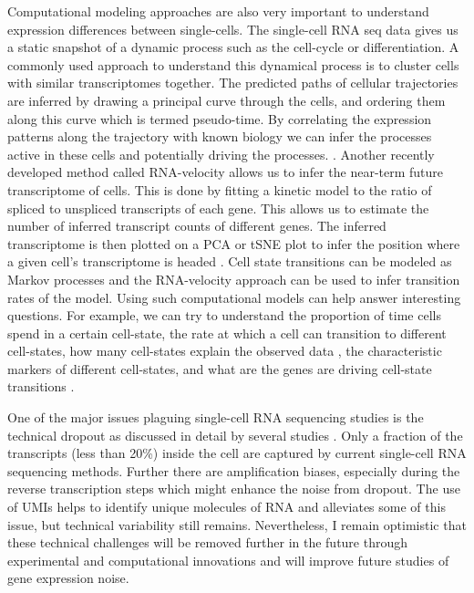 Computational modeling approaches are also very important to understand expression differences between single-cells. The single-cell RNA seq data gives us a static snapshot of a dynamic process such as the cell-cycle or differentiation. A commonly used approach to understand this dynamical process is to cluster cells with similar transcriptomes together. The predicted paths of cellular trajectories are inferred by drawing a principal curve through the cells, and ordering them along this curve which is termed pseudo-time. By correlating the expression patterns along the trajectory with known biology we can infer the processes active in these cells and potentially driving the processes. \cite{trapnell_dynamics_2014}. Another recently developed method called RNA-velocity allows us to infer the near-term future transcriptome of cells. This is done by fitting a kinetic model to the ratio of spliced to unspliced transcripts of each gene. This allows us to estimate the number of inferred transcript counts of different genes. The inferred transcriptome is then plotted on a PCA or tSNE plot to infer the position where a given cell's transcriptome is headed \cite{manno_rna_2018}. Cell state transitions can be modeled as Markov processes \cite{stumpf_stem_2017} and the RNA-velocity approach can be used to infer transition rates of the model. Using such computational models can help answer interesting questions. For example, we can try to understand the proportion of time cells spend in a certain cell-state,  the rate at which a cell can transition to different cell-states, how many cell-states explain the observed data \cite{chang_transcriptome-wide_2008}, the characteristic markers of different cell-states, and what are the genes are driving cell-state transitions \cite{furchtgott_discovering_2017}.

One of the major issues plaguing single-cell RNA sequencing studies is the technical dropout as discussed in detail by several studies \cite{eling2019nrga} \cite{tung2017sr} \cite{hicks2018ba}. Only a fraction of the transcripts (less than 20\%) inside the cell are captured by current single-cell RNA sequencing methods. Further there are amplification biases, especially during the reverse transcription steps which might enhance the noise from dropout. The use of UMIs helps to identify unique molecules of RNA and alleviates some of this issue, but technical variability still remains. Nevertheless, I remain optimistic that these technical challenges will be removed further in the future through experimental and computational innovations and will improve future studies of gene expression noise.

